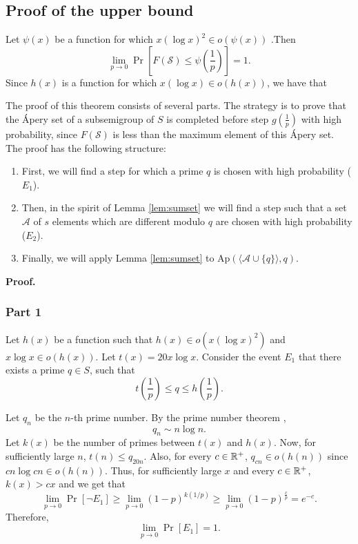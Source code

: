 \subsection{Proof of the upper bound} 
\begin{lemma}\label{lem:upperbound}
    Let $\psi(x)$ be a function for which $x(\log x)^2 \in o(\psi(x))$ .Then
    \[\lim_{p \to 0}\Pr\left[F(\mathcal{S}) \leq \psi\left(\frac{1}{p}\right)\right] = 1.\] 
    Since $h(x)$ is a function for which $x(\log x) \in o(h(x))$, we have that
\end{lemma}

\par The proof of this theorem consists of several parts. The strategy is to prove that the Ápery set of a subsemigroup of $S$ is completed before step $g\left(\frac{1}{p}\right)$ with high probability, since $F(\mathcal{S})$ is less than the maximum element of this Ápery set. The proof has the following structure: 
\begin{enumerate}
\item First, we will find a step for which a prime $q$ is chosen with high probability ($E_1$). 
\item Then, in the spirit of Lemma \ref{lem:sumset} we will find a step such that a set $\mathcal{A}$ of $s$ elements which are different modulo $q$ are chosen with high probability ($E_2$). 
\item Finally, we will apply Lemma \ref{lem:sumset} to $\mathrm{Ap}(\langle \mathcal{A} \cup \{q\}\rangle, q)$.
\end{enumerate}
\textbf{Proof. }
\subsubsection*{Part 1} 
Let \(h(x)\) be a function such that \(h(x) \in o(x (\log x)^2)\) and \(x\log x \in o(h(x))\). Let $t(x) = 20x \log x$. Consider the event
$E_1$ that there exists a prime $q \in S$, such that 
\[t\left(\frac{1}{p}\right) \leq q \leq h\left(\frac{1}{p}\right).\]
\par 
Let $q_n$ be the $n$-th prime number. By the prime number theorem \cite[Theorem 8]{hardy1979introduction}, 
\begin{equation}\label{eq:pnt}
q_n \sim n \log n.
\end{equation}
Let $k(x)$ be the number of primes between $t(x)$ and $h(x)$. Now, for sufficiently large $n$, $t(n) \leq q_{20n}$. Also, for every $c \in \mathbb{R}^+$, $q_{cn} \in o(h(n))$ since $cn\log cn \in o(h(n))$. Thus, for sufficiently large $x$ and every $c \in \mathbb{R}^+$, $k(x) > cx$
and we get that
\[\lim_{p \to 0}\Pr[\lnot E_1] \geq \lim_{p \to 0} (1 - p)^{k(1/p)} \geq \lim_{p \to 0} (1 - p)^{\frac{c}{p}} = e^{-c}.\]
Therefore, 
\begin{equation}\label{eq:upperbound:e1}
    \lim_{p \to 0}\Pr[E_1] = 1.
\end{equation}
